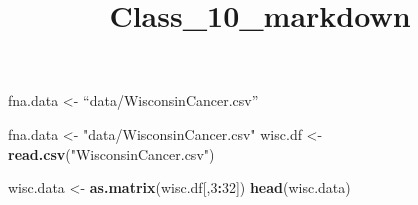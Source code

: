 \documentclass[
]{article}
\title{Class\_10\_markdown}
\author{}
\date{\vspace{-2.5em}}
\newenvironment{Shaded}{\begin{snugshade}}{\end{snugshade}}
\newcommand{\DecValTok}[1]{\textcolor[rgb]{0.00,0.00,0.81}{#1}}
\newcommand{\KeywordTok}[1]{\textcolor[rgb]{0.13,0.29,0.53}{\textbf{#1}}}
\newcommand{\NormalTok}[1]{#1}
\newcommand{\OperatorTok}[1]{\textcolor[rgb]{0.81,0.36,0.00}{\textbf{#1}}}
\newcommand{\StringTok}[1]{\textcolor[rgb]{0.31,0.60,0.02}{#1}}
\begin{document}
\maketitle

fna.data \textless- ``data/WisconsinCancer.csv''

\begin{Shaded}
\begin{Highlighting}[]
\NormalTok{fna.data <-}\StringTok{ "data/WisconsinCancer.csv"}
\NormalTok{wisc.df <-}\StringTok{ }\KeywordTok{read.csv}\NormalTok{(}\StringTok{"WisconsinCancer.csv"}\NormalTok{)}
\end{Highlighting}
\end{Shaded}

\begin{Shaded}
\begin{Highlighting}[]
\NormalTok{wisc.data <-}\StringTok{ }\KeywordTok{as.matrix}\NormalTok{(wisc.df[,}\DecValTok{3}\OperatorTok{:}\DecValTok{32}\NormalTok{])}
\KeywordTok{head}\NormalTok{(wisc.data)}
\end{Highlighting}
\end{Shaded}
\end{document}

